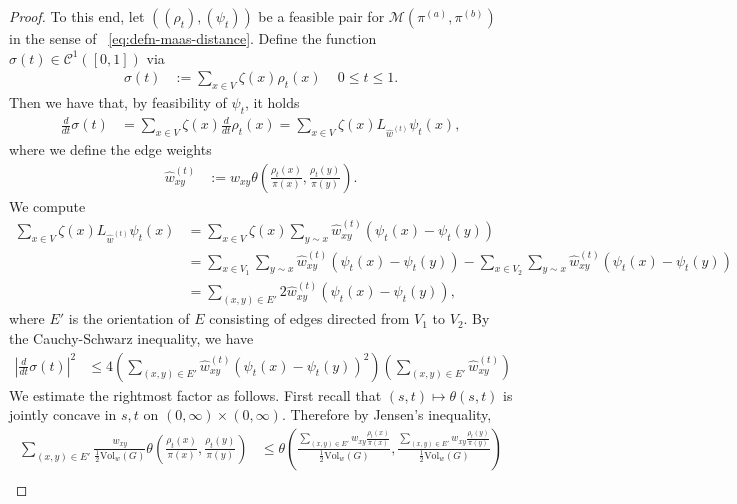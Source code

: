 \documentclass[11pt,a4paper]{article}
\newcommand{\Maas}{\mathcal{M}}
\newcommand{\Vol}{\mathrm{Vol}}
\begin{document}
\begin{proof}
    To this end, let $((\rho_t),(\psi_t))$ be a feasible pair for $\Maas(\pi^{(a)},\pi^{(b)})$ in the sense of ~\cref{eq:defn-maas-distance}. Define the function $\sigma(t) \in \mathcal{C}^{1}([0,1])$ via
        \begin{align*}
            \sigma(t) &:= \sum_{x\in V} \zeta(x) \rho_t(x)\,\quad 0\le t\le 1.
        \end{align*}
    Then we have that, by feasibility of $\psi_t$, it holds
        \begin{align*}
            \frac{d}{dt}\sigma(t) &= \sum_{x\in V} \zeta(x) \frac{d}{dt}\rho_t(x) =  \sum_{x\in V} \zeta(x) L_{\widehat{w}^{(t)}} \psi_t(x),
        \end{align*}
    where we define the edge weights
        \begin{align*}
            \widehat{w}^{(t)}_{xy} &:= w_{xy}\theta\left(\frac{\rho_t(x)}{\pi(x)}, \frac{\rho_t(y)}{\pi(y)}\right).
        \end{align*}
    We compute
        \begin{align*}
            \sum_{x\in V} \zeta(x) L_{\widehat{w}^{(t)}} \psi_t(x) &= \sum_{x\in V} \zeta(x) \sum_{y\sim x} \widehat{w}_{xy}^{(t)} (\psi_t(x) - \psi_t(y)) \\
            &= \sum_{x\in V_1} \sum_{y\sim x} \widehat{w}_{xy}^{(t)} (\psi_t(x) - \psi_t(y)) - \sum_{x\in V_2} \sum_{y\sim x} \widehat{w}_{xy}^{(t)} (\psi_t(x) - \psi_t(y))\\
            &= \sum_{(x,y)\in E'} 2 \widehat{w}_{xy}^{(t)} (\psi_t(x) - \psi_t(y)),
        \end{align*}
    where $E'$ is the orientation of $E$ consisting of edges directed from $V_1$ to $V_2$. By the Cauchy-Schwarz inequality, we have
        \begin{align}\label{eq:bipartite-cauchy-schwarz}
            \left|\frac{d}{dt}\sigma(t)\right|^2 &\leq 4 \left(\sum_{(x,y)\in E'} \widehat{w}_{xy}^{(t)} (\psi_t(x) - \psi_t(y))^2\right) \left(\sum_{(x,y)\in E'} \widehat{w}_{xy}^{(t)}\right)
        \end{align}
    We estimate the rightmost factor as follows. First recall that $(s,t)\mapsto \theta(s, t)$ is jointly concave in $s,t$ on $(0,\infty)\times(0,\infty)$. Therefore by Jensen's inequality,
        \begin{align*}
            \sum_{(x,y)\in E'} \frac{w_{xy}}{\frac{1}{2}\Vol_w(G)} \theta\left(\frac{\rho_t(x)}{\pi(x)}, \frac{\rho_t(y)}{\pi(y)}\right) &\leq \theta\left( \frac{ \sum_{(x,y)\in E'} w_{xy} \frac{\rho_t(x)}{\pi(x)}}{\frac{1}{2}\Vol_w(G)},  \frac{ \sum_{(x,y)\in E'} w_{xy} \frac{\rho_t(y)}{\pi(y)}}{\frac{1}{2}\Vol_w(G)} \right)\\

\end{align*}
\end{proof}
\end{document}
